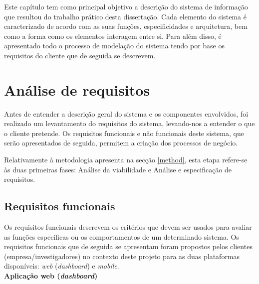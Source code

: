 Este capítulo tem como principal objetivo a descrição do sistema de informação que resultou do trabalho prático desta dissertação. Cada elemento do sistema é caracterizado de acordo com as suas funções, especificidades e arquitetura, bem como a forma como os elementos interagem entre si. Para além disso, é apresentado todo o processo de modelação do sistema tendo por base os requisitos do cliente que de seguida se descrevem.


\section{Análise de requisitos}
\label{sect:analise}



Antes de entender a descrição geral do sistema e os componentes envolvidos, foi realizado um levantamento do requisitos do sistema, levando-nos a entender o que o cliente pretende. Os requisitos funcionais e não funcionais deste sistema, que serão apresentados de seguida, permitem a criação dos processos de negócio. 


 Relativamente à metodologia apresenta na secção \ref{method}, esta etapa refere-se às duas primeiras fases: Análise da viabilidade e Análise e especificação de requisitos. 


\subsection{Requisitos funcionais}


Os requisitos funcionais descrevem os critérios que devem ser usados para avaliar as funções específicas ou os comportamentos de um determinado sistema. Os requisitos funcionais que de seguida se apresentam foram propostos pelos clientes (empresa/investigadores) no contexto deste projeto para as duas plataformas disponíveis: \textit{web} (\textit{dashboard}) e \textit{mobile}. \\


\textbf{Aplicação web (\textit{dashboard})}


